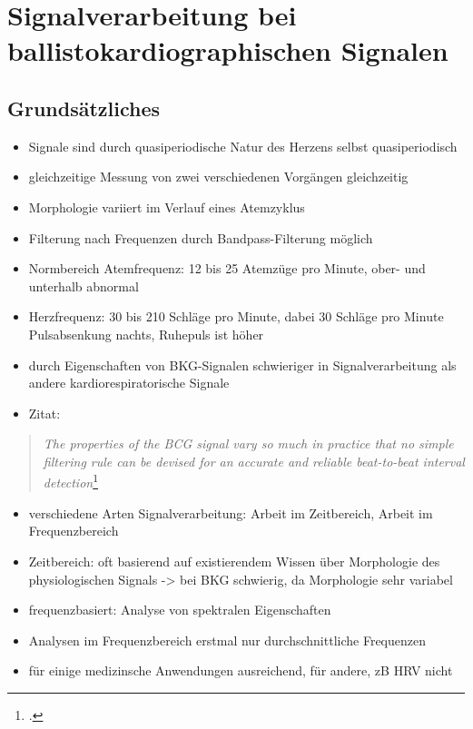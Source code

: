 \chapter{Signalverarbeitung bei ballistokardiographischen Signalen}

\section{Grundsätzliches}

\begin{itemize}
	\item Signale sind durch quasiperiodische Natur des Herzens selbst quasiperiodisch
	\item gleichzeitige Messung von zwei verschiedenen Vorgängen gleichzeitig
	\item Morphologie variiert im Verlauf eines Atemzyklus
	\item Filterung nach Frequenzen durch Bandpass-Filterung möglich
	\item Normbereich Atemfrequenz: 12 bis 25 Atemzüge pro Minute, ober- und unterhalb abnormal
	\item Herzfrequenz: 30 bis 210 Schläge pro Minute, dabei 30 Schläge pro Minute Pulsabsenkung nachts, Ruhepuls ist höher
	\item durch Eigenschaften von \ac{BKG}-Signalen schwieriger in Signalverarbeitung als andere kardiorespiratorische Signale
	\item \citeauthor{Paalasmaa2015} Zitat:
\end{itemize}

\begin{quote}\textit{The properties of the BCG signal vary so much in practice that no simple filtering rule can be devised for an accurate and reliable beat-to-beat interval detection}\footcite{Paalasmaa2015}\end{quote}

\begin{itemize}
	\item verschiedene Arten Signalverarbeitung: Arbeit im Zeitbereich, Arbeit im Frequenzbereich
	\item Zeitbereich: oft basierend auf existierendem Wissen über Morphologie des physiologischen Signals -> bei \ac{BKG} schwierig, da Morphologie sehr variabel
	\item frequenzbasiert: Analyse von spektralen Eigenschaften
	\item Analysen im Frequenzbereich erstmal nur durchschnittliche Frequenzen
	\item für einige medizinsche Anwendungen ausreichend, für andere, zB \ac{HRV} nicht
\end{itemize}

